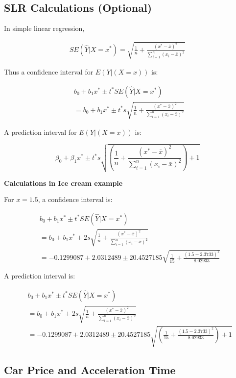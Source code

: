 \documentclass[
  letterpaper,
  DIV=11,
  numbers=noendperiod]{scrreprt}
\begin{document}
\subsection{SLR Calculations
(Optional)}\label{slr-calculations-optional}

In simple linear regression,

\[
\begin{aligned}
SE(\hat{Y}|X=x^*) = \sqrt{\frac{1}{n}+ \frac{(x^*-\bar{x})^2}{\displaystyle\sum_{i=1}^n(x_i-\bar{x})^2}}
\end{aligned}
\]

Thus a confidence interval for \(E(Y | (X=x))\) is:

\[
\begin{aligned}
& b_0+b_1x^* \pm t^*SE(\hat{Y}|X=x^*) \\
& = b_0+b_1x^* \pm t^*s\sqrt{\frac{1}{n}+ \frac{(x^*-\bar{x})^2}{\displaystyle\sum_{i=1}^n(x_i-\bar{x})^2}}  \
\end{aligned}
\]

A prediction interval for \(E(Y | (X=x))\) is:

\[
\beta_0 + \beta_1x^* \pm t^* s\sqrt{\left(\frac{1}{n}+ \frac{(x^*-\bar{x})^2}{\displaystyle\sum_{i=1}^n(x_i-\bar{x})^2}\right) + 1} 
\]

\textbf{Calculations in Ice cream example}

For \(x=1.5\), a confidence interval is:

\[
\begin{aligned}
& b_0+b_1x^* \pm t^*SE(\hat{Y}|X=x^*) \\
& = b_0+b_1x^* \pm 2s\sqrt{\frac{1}{n}+ \frac{(x^*-\bar{x})^2}{\displaystyle\sum_{i=1}^n(x_i-\bar{x})^2}}  \\
& = -0.1299087 + 2.0312489 \pm 20.4527185 \sqrt{\frac{1}{15}+ \frac{(1.5-2.3733)^2}{8.02933}}
\end{aligned}
\]

A prediction interval is:

\[
\begin{aligned}
& b_0+b_1x^* \pm t^*SE(\hat{Y}|X=x^*) \\
& = b_0+b_1x^* \pm 2s\sqrt{\frac{1}{n}+ \frac{(x^*-\bar{x})^2}{\displaystyle\sum_{i=1}^n(x_i-\bar{x})^2}}  \\
& = -0.1299087 + 2.0312489 \pm 20.4527185 \sqrt{\left(\frac{1}{15}+ \frac{(1.5-2.3733)^2}{8.02933}\right)+1}
\end{aligned}
\]

\subsection{Car Price and Acceleration
Time}\label{car-price-and-acceleration-time}
\end{document}
